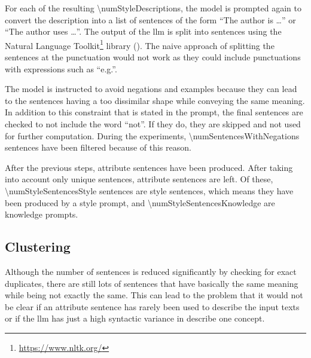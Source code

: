 For each of the resulting \num{\numStyleDescriptions}, the model is prompted again to convert the description into a list of sentences of the form \enquote{The author is \ldots} or \enquote{The author uses \ldots}. The output of the \ac{llm} is split into sentences using the Natural Language Toolkit\footnote{\url{https://www.nltk.org/}} library (\cite{birdNaturalLanguageProcessing2009}). The naive approach of splitting the sentences at the punctuation would not work as they could include punctuations with expressions such as \enquote{e.g.}.

The model is instructed to avoid negations and examples because they can lead to the sentences having a too dissimilar shape while conveying the same meaning. In addition to this constraint that is stated in the prompt, the final sentences are checked to not include the word \enquote{not}. If they do, they are skipped and not used for further computation. During the experiments, \num{\numSentencesWithNegations} sentences have been filtered because of this reason.

After the previous steps, \numStyleSentencesNotUniqueText{} attribute sentences have been produced. After taking into account only unique sentences, \numStyleSentencesText{} attribute sentences are left. Of these, \num{\numStyleSentencesStyle} sentences are style sentences, which means they have been produced by a style prompt, and \num{\numStyleSentencesKnowledge} are knowledge prompts.

\subsection{Clustering}
\label{sec:experiments_evaluation:implementation:clustering}
Although the number of sentences is reduced significantly by checking for exact duplicates, there are still lots of sentences that have basically the same meaning while being not exactly the same. This can lead to the problem that it would not be clear if an attribute sentence has rarely been used to describe the input texts or if the \ac{llm} has just a high syntactic variance in describe one concept.

